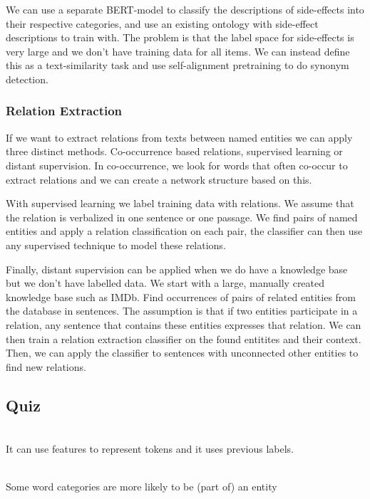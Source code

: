 We can use a separate BERT-model to classify the descriptions of side-effects
into their respective categories, and use an existing ontology with side-effect
descriptions to train with. The problem is that the label space for
side-effects is
very large and we don't have training data for all items. We can
instead define this
as a text-similarity task and use self-alignment pretraining to do
synonym detection.

\subsubsection{Relation Extraction}

If we want to extract relations from texts between named entities we
can apply three
distinct methods. Co-occurrence based relations, supervised learning
or distant supervision.
In co-occurrence, we look for words that often co-occur to extract
relations and we can create
a network structure based on this.

With supervised learning we label training data with relations. We
assume that the relation is verbalized in one sentence or one passage.
We find pairs of named entities and apply a relation classification
on each pair, the
classifier can then use any supervised technique to model these relations.

Finally, distant supervision can be applied when we do have a
knowledge base but we
don't have labelled data. We start with a large, manually created
knowledge base such
as IMDb. Find occurrences of pairs of related entities from the
database in sentences.
The assumption is that if two entities participate in a relation, any
sentence that contains
these entities expresses that relation. We can then train a relation
extraction classifier on
the found entitites and their context. Then, we can apply the
classifier to sentences with
unconnected other entities to find new relations.

\subsection{Quiz}

\begin{quiz}
  ~\\
  It can use features to represent tokens and it uses previous labels.
\end{quiz}

\begin{quiz}
  ~\\
  Some word categories are more likely to be (part of) an entity
\end{quiz}

